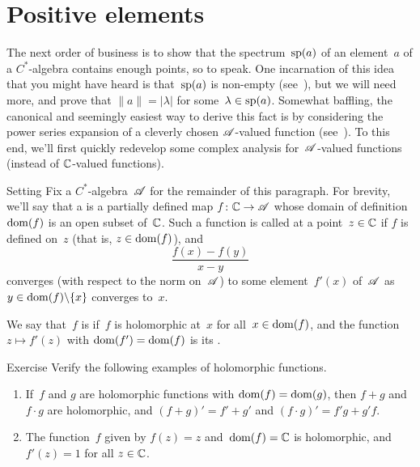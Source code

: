 \documentclass[a]{subfiles}
\begin{document}
\section{Positive elements}
\begin{parsec}%
\begin{point}%
The next order of business
is to show that the spectrum~$\mathrm{sp}(a)$ of an element~$a$
of a $C^*$-algebra contains enough points, so to speak.
One incarnation of this idea that you might have heard
is that~$\mathrm{sp}(a)$ is non-empty
(see~), but
we will need more,
and prove that  $\|a\|=\left|\lambda\right|$
for some~$\lambda\in\mathrm{sp}(a)$.
Somewhat baffling,
the canonical and seemingly
easiest way to derive this fact is by considering the power series
expansion of a cleverly chosen $\mathscr{A}$-valued function
(see~).
To this end,
we'll first quickly redevelop some complex analysis
for~$\mathscr{A}$-valued functions
(instead of $\mathbb{C}$-valued functions).
\end{point}
\begin{point}{Setting}%
Fix a $C^*$-algebra~$\mathscr{A}$ for the remainder of this paragraph.
For brevity,
we'll say that a 
is a partially defined map $f\colon \mathbb{C}\to \mathscr{A}$
whose domain of definition $\operatorname{dom}(f)$ is an open subset of~$\mathbb{C}$.
Such a function is called  at a point~$z\in \mathbb{C}$
if $f$ is defined on~$z$ (that is, $z\in \operatorname{dom}(f)$),
and 
\begin{equation*}
\frac{f(x)-f(y)}{x-y}
\end{equation*}
converges (with respect to the norm on~$\mathscr{A}$)
to some element~$f'(x)$ of~$\mathscr{A}$
as $y\in \operatorname{dom}(f)\backslash\{x\}$
converges to~$x$.

We say that~$f$ is 
if~$f$ is holomorphic at~$x$ for all~$x\in \operatorname{dom}(f)$,
and the function $z\mapsto f'(z)$
with $\operatorname{dom}(f')=\operatorname{dom}(f)$
is its .
\end{point}
\begin{point}{Exercise}%
Verify the following examples of holomorphic functions.
\begin{enumerate}
\item
If~$f$ and $g$ are holomorphic functions with $\operatorname{dom}(f)=\operatorname{dom}(g)$,
then $f+g$ and $f\cdot g$ are holomorphic,
and $(f+g)'=f'+g'$ and $(f\cdot g)' = f'g+g'f$.

\item
The function~$f$ given by $f(z)=z$ and~$\operatorname{dom}(f)=\mathbb{C}$
is holomorphic, and $f'(z)=1$ for all $z\in\mathbb{C}$.


\end{enumerate}
\end{point}
\end{parsec}
\end{document}

